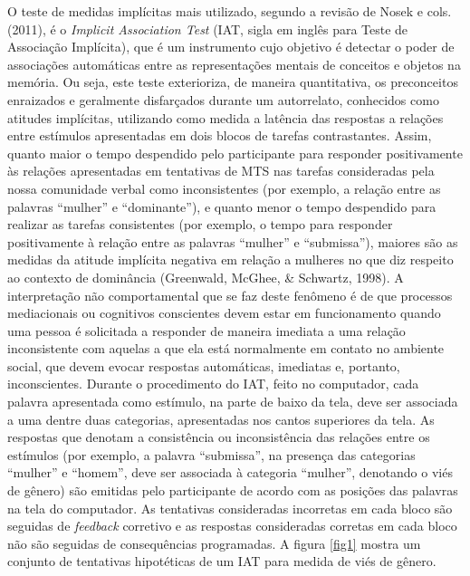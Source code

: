 O teste de medidas implícitas mais utilizado, segundo a revisão de Nosek e cols. (2011), é o \textit{Implicit Association Test} (IAT, sigla em inglês para Teste de Associação Implícita), que é um instrumento cujo objetivo é detectar o poder de associações automáticas entre as representações mentais de conceitos e objetos na memória. Ou seja, este teste exterioriza, de maneira quantitativa, os preconceitos enraizados e geralmente disfarçados durante um autorrelato, conhecidos como atitudes implícitas, utilizando como medida a latência das respostas a relações entre estímulos apresentadas em dois blocos de tarefas contrastantes. Assim, quanto maior o tempo despendido pelo participante para responder positivamente às relações apresentadas em tentativas de MTS nas tarefas consideradas pela nossa comunidade verbal como inconsistentes (por exemplo, a relação entre as palavras ``mulher'' e ``dominante''), e quanto menor o tempo despendido para realizar as tarefas consistentes (por exemplo, o tempo para responder positivamente à relação entre as palavras ``mulher'' e ``submissa''), maiores são as medidas da atitude implícita negativa em relação a mulheres no que diz respeito ao contexto de dominância (Greenwald, McGhee, \& Schwartz, 1998). A interpretação não comportamental que se faz deste fenômeno é de que processos mediacionais ou cognitivos conscientes devem estar em funcionamento quando uma pessoa é solicitada a responder de maneira imediata a uma relação inconsistente com aquelas a que ela está normalmente em contato no ambiente social, que devem evocar respostas automáticas, imediatas e, portanto, inconscientes. Durante o procedimento do IAT, feito no computador, cada palavra apresentada como estímulo, na parte de baixo da tela, deve ser associada a uma dentre duas categorias, apresentadas nos cantos superiores da tela. As respostas que denotam a consistência ou inconsistência das relações entre os estímulos (por exemplo, a palavra ``submissa'', na presença das categorias ``mulher'' e ``homem'', deve ser associada à categoria ``mulher'', denotando o viés de gênero) são emitidas pelo participante de acordo com as posições das palavras na tela do computador. As tentativas consideradas incorretas em cada bloco são seguidas de \textit{feedback} corretivo e as respostas consideradas corretas em cada bloco não são seguidas de consequências programadas. A figura \ref{fig1} mostra um conjunto de tentativas hipotéticas de um IAT para medida de viés de gênero.

